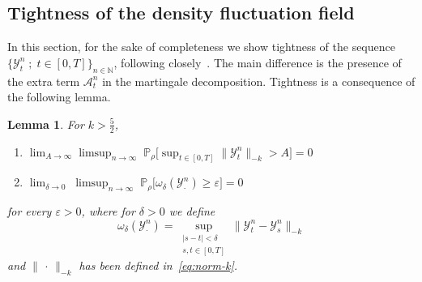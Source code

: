 \documentclass[10pt]{amsart}
\newtheorem{lemm}[theo]{Lemma}\newtheorem{prop}[theo]{Proposition}\newtheorem{coro}[theo]{Corollary}\newtheorem{conj}[theo]{Conjecture}
\theoremstyle{definition}\newtheorem{defi}[theo]{Definition}\newtheorem{rema}[theo]{Remark}\newtheorem{exam}[theo]{Example}\newtheorem{exem}[theo]{Example}\newtheorem{nota}[theo]{Notation}
\newcommand{\mc}[1]{{\mathcal #1}}
\renewcommand{\mc}[1]{{\mathcal #1}}
\renewcommand{\geq}{\geqslant}
\renewcommand{\epsilon}{\varepsilon}
\begin{document}
\subsection{Tightness of the density fluctuation field}\label{sec:tightness}

In this section, for the sake of completeness we show tightness of the sequence $\{{\mathcal Y}_t^n\; ; \; t \in [0,T]\}_{n\in\mathbb{N}}$, following closely~\cite{kl}. The main difference is the presence of the extra term $\mc A_t^n$ in the martingale decomposition. Tightness is a consequence of the following lemma.

\begin{lemm}\label{lem:tight}
For $k>\frac52$,
\begin{enumerate}
\item \label{4.4.1} $\displaystyle\lim_{A\rightarrow{\infty}}\limsup_{n\rightarrow{\infty}}\; \mathbb{P}_{\rho}\Big[\sup_{t\in[0,T]}\|{{\mathcal Y}}_{t}^{n}\|_{-k}>A\Big]=0$
\item \label{4.4.2} $\displaystyle \lim_{\delta\rightarrow{0}}\; \limsup_{n\rightarrow{\infty}}\;\mathbb{P}_{\rho}\Big[\omega_{\delta} ({{\mathcal Y}}_{\cdot}^{n})\geq{\epsilon}\Big]=0$
\end{enumerate}
for every $\epsilon>0$, where for $\delta>0$ we define
\begin{equation*}
\omega_{\delta}({\mathcal{Y}}_{\cdot}^{n})=\sup_{\substack{|s-t|<\delta\\s,t \in [0,T]}}\|{\mathcal Y}_{t}^{n}-{{\mathcal Y}}_{s}^{n}\|_{-k}
\end{equation*}
and $\|{\,\cdot\,}\|_{-k}$ has been defined in~\eqref{eq:norm-k}.
\end{lemm}
\end{document}
